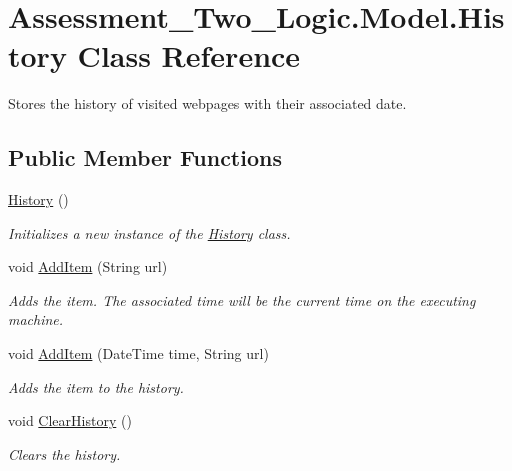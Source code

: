 \hypertarget{class_assessment___two___logic_1_1_model_1_1_history}{
\section{Assessment\_\-Two\_\-Logic.Model.History Class Reference}
\label{class_assessment___two___logic_1_1_model_1_1_history}
}


Stores the history of visited webpages with their associated date.  


\subsection*{Public Member Functions}
\begin{DoxyCompactItemize}
\item 
\hyperlink{class_assessment___two___logic_1_1_model_1_1_history_a6b4fb7bb182a57c1451b14b98b1a1417}{History} ()
\begin{DoxyCompactList}\small\item\em Initializes a new instance of the \hyperlink{class_assessment___two___logic_1_1_model_1_1_history}{History} class. \item\end{DoxyCompactList}\item 
void \hyperlink{class_assessment___two___logic_1_1_model_1_1_history_a549b8b65ee161e4f6ccb4f60b5e8d0e7}{AddItem} (String url)
\begin{DoxyCompactList}\small\item\em Adds the item. The associated time will be the current time on the executing machine. \item\end{DoxyCompactList}\item 
void \hyperlink{class_assessment___two___logic_1_1_model_1_1_history_a9a8fe5be5a80c9be9924281829f6adbe}{AddItem} (DateTime time, String url)
\begin{DoxyCompactList}\small\item\em Adds the item to the history. \item\end{DoxyCompactList}\item 
void \hyperlink{class_assessment___two___logic_1_1_model_1_1_history_a4bb45b54bb2ee0714547b164ac3b020b}{ClearHistory} ()
\begin{DoxyCompactList}\small\item\em Clears the history. \item\end{DoxyCompactList}\end{DoxyCompactItemize}

